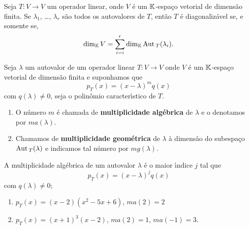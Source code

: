 \begin{corolario}
	Seja $T : V \to V$ um operador linear, onde $V$ \'e um $\mathbb{K}$-espa\c{c}o vetorial de dimens\~ao finita. Se $\lambda_1$, \dots, $\lambda_r$ s\~ao todos os autovalores de $T$, ent\~ao $T$ \'e diagonaliz\'avel se, e somente se,
	\[
		\dim_{\mathbb{K}} V = \sum_{i = i}^r\dim_{\mathbb{K}}{\rm Aut\,}_T(\lambda_i).
	\]
\end{corolario}

\begin{definicao}
	Seja $\lambda$ um autovalor de um operador linear $T : V \to V$ onde $V$ \'e um $\mathbb{K}$-espa\c{c}o vetorial de dimens\~ao finita e suponhamos que
	\[
		p_T(x) = (x - \lambda)^mq(x)
	\]
	com $q(\lambda) \ne 0$, seja o polin\^omio caracter{\'\i}stico de $T$.
	\begin{enumerate}[label={\roman*})]
		\item O n\'umero $m$ \'e chamada de \textbf{multiplicidade alg\'ebrica} de $\lambda$ e o denotamos por $ma(\lambda)$.
		\item Chamamos de \textbf{multiplicidade geom\'etrica} de $\lambda$ \`a dimens\~ao do subespa\c{c}o ${\rm Aut\,}_T(\lambda)$ e indicamos tal n\'umero por $mg(\lambda)$.
	\end{enumerate}
\end{definicao}

\begin{observacao}
	A multiplicidade alg\'ebrica de um autovalor $\lambda$ \'e o maior {\'\i}ndice $j$ tal que
	\[
		p_T(x) = (x - \lambda)^jq(x)
	\]
	com $q(\lambda) \ne 0$;
\end{observacao}

\begin{exemplo}
	\begin{enumerate}[label={\arabic*})]
		\item $p_T(x) = (x - 2)(x^2 - 5x + 6)$, $ma(2) = 2$
		\item $p_T(x) = (x + 1)^3(x - 2)$, $ma(2) = 1$, $ma(-1) = 3$.
	\end{enumerate}
\end{exemplo}


